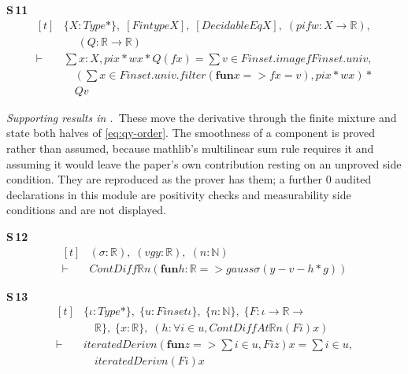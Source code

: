 \noindent\textbf{S\,11}\quad{}
{\footnotesize\[ \begin{aligned}[t]
&\{ \mathit{X} : \mathit{Type}*\},\; [\mathit{Fintype} \mathit{X}],\; [\mathit{DecidableEq} \mathit{X}],\; (\mathit{pi} \mathit{f} \mathit{w} : \mathit{X} \to \mathbb{R} ),\\
&\quad \; (\mathit{Q} : \mathbb{R} \to \mathbb{R} )\\
\vdash\;&\textstyle\sum \mathit{x} : \mathit{X}, \mathit{pi} \mathit{x} * \mathit{w} \mathit{x} * \mathit{Q} (\mathit{f} \mathit{x}) = \textstyle\sum \mathit{v} \in \mathit{Finset}.\mathit{image} \mathit{f} \mathit{Finset}.\mathit{univ},\\
&\quad (\textstyle\sum \mathit{x} \in \mathit{Finset}.\mathit{univ}.\mathit{filter} (\mathbf{fun} \mathit{x} => \mathit{f} \mathit{x} = \mathit{v}), \mathit{pi} \mathit{x} * \mathit{w} \mathit{x}) *\\
&\quad \mathit{Q} \mathit{v}
\end{aligned} \]}


\noindent\emph{Supporting results in .}~These move the derivative through the finite mixture and state both halves of \eqref{eq:qy-order}. The smoothness of a component is proved rather than assumed, because mathlib's multilinear sum rule requires it and assuming it would leave the paper's own contribution resting on an unproved side condition. They are reproduced as the prover has them; a further $0$ audited declarations in this module are positivity checks and measurability side conditions and are not displayed.

\noindent\textbf{S\,12}\quad{}
{\footnotesize\[ \begin{aligned}[t]
&(\sigma : \mathbb{R} ),\; (\mathit{v} \mathit{g} \mathit{y} : \mathbb{R} ),\; (\mathit{n} : \mathbb{N} )\\
\vdash\;&\mathit{ContDiff} \mathbb{R} \mathit{n} (\mathbf{fun} \mathit{h} : \mathbb{R} => \mathit{gauss} \sigma (\mathit{y} - \mathit{v} - \mathit{h} * \mathit{g}))
\end{aligned} \]}

\noindent\textbf{S\,13}\quad{}
{\footnotesize\[ \begin{aligned}[t]
&\{ \iota : \mathit{Type}*\},\; \{ \mathit{u} : \mathit{Finset} \iota \},\; \{ \mathit{n} : \mathbb{N} \},\; \{ \mathit{F} : \iota \to \mathbb{R} \to\\
&\quad \mathbb{R} \},\; \{ \mathit{x} : \mathbb{R} \},\; (\mathit{h} : \forall \mathit{i} \in \mathit{u}, \mathit{ContDiffAt} \mathbb{R} \mathit{n} (\mathit{F} \mathit{i}) \mathit{x})\\
\vdash\;&\mathit{iteratedDeriv} \mathit{n} (\mathbf{fun} \mathit{z} => \textstyle\sum \mathit{i} \in \mathit{u}, \mathit{F} \mathit{i} \mathit{z}) \mathit{x} = \textstyle\sum \mathit{i} \in \mathit{u},\\
&\quad \mathit{iteratedDeriv} \mathit{n} (\mathit{F} \mathit{i}) \mathit{x}
\end{aligned} \]}


